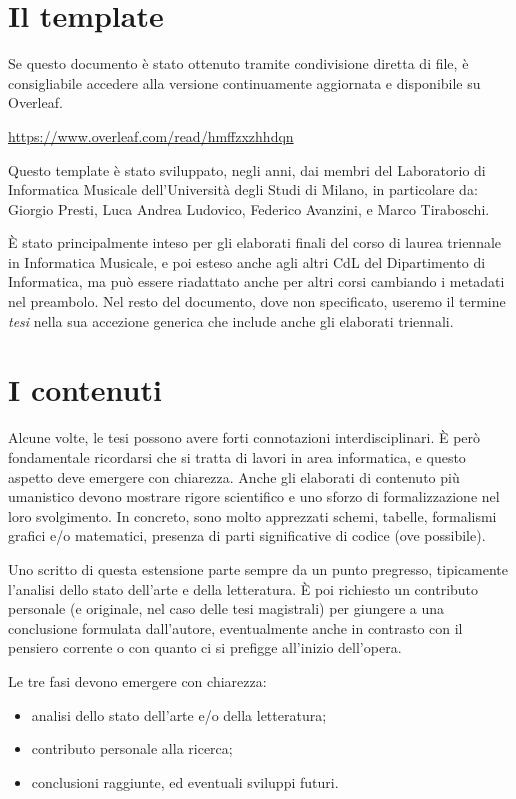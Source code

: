 \documentclass[12pt]{report}
\begin{document}
\section{Il template}
Se questo documento è stato ottenuto tramite condivisione diretta di file, è consigliabile accedere alla versione continuamente aggiornata e disponibile su Overleaf. \begin{center}
    \url{https://www.overleaf.com/read/hmffzxzhhdqn}
\end{center}

Questo template è stato sviluppato, negli anni, dai membri del Laboratorio di Informatica Musicale dell'Università degli Studi di Milano, in particolare da: Giorgio Presti, Luca Andrea Ludovico, Federico Avanzini, e Marco Tiraboschi.

È stato principalmente inteso per gli elaborati finali del corso di laurea triennale in Informatica Musicale, e poi esteso anche agli altri CdL del Dipartimento di Informatica, ma può essere riadattato anche per altri corsi cambiando i metadati nel preambolo. Nel resto del documento, dove non specificato, useremo il termine \textit{tesi} nella sua accezione generica che include anche gli elaborati triennali.

\section{I contenuti}
\label{sec:contenuti}

Alcune volte, le tesi possono avere forti connotazioni interdisciplinari. \`{E} però fondamentale ricordarsi che si tratta di lavori in area informatica, e questo aspetto deve emergere con chiarezza. Anche gli elaborati di contenuto più umanistico devono mostrare rigore scientifico e uno sforzo di formalizzazione nel loro svolgimento. In concreto, sono molto apprezzati schemi, tabelle, formalismi grafici e/o matematici, presenza di parti significative di codice (ove possibile).

Uno scritto di questa estensione parte sempre da un punto pregresso, tipicamente l'analisi dello stato dell'arte e della letteratura. \`{E} poi richiesto un contributo personale (e originale, nel caso delle tesi magistrali) per giungere a una conclusione formulata dall'autore, eventualmente anche in contrasto con il pensiero corrente o con quanto ci si prefigge all'inizio dell'opera.

Le tre fasi devono emergere con chiarezza:
\begin{itemize}
	\item analisi dello stato dell'arte e/o della letteratura;
	\item contributo personale alla ricerca;
	\item conclusioni raggiunte, ed eventuali sviluppi futuri.
\end{itemize}
\end{document}

